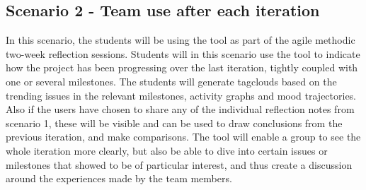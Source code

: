 \subsection{Scenario 2 - Team use after each iteration}
\label{scenario2}
In this scenario, the students will be using the tool as part of the agile methodic two-week reflection sessions. Students will in this scenario use the tool to indicate how the project has been progressing over the last iteration, tightly coupled with one or several milestones. The students will generate tagclouds based on the trending issues in the relevant milestones, activity graphs and mood trajectories. Also if the users have chosen to share any of the individual reflection notes from scenario 1, these will be visible and can be used to draw conclusions from the previous iteration, and make comparisons. The tool will enable a group to see the whole iteration more clearly, but also be able to dive into certain issues or milestones that showed to be of particular interest, and thus create a discussion around the experiences made by the team members.  